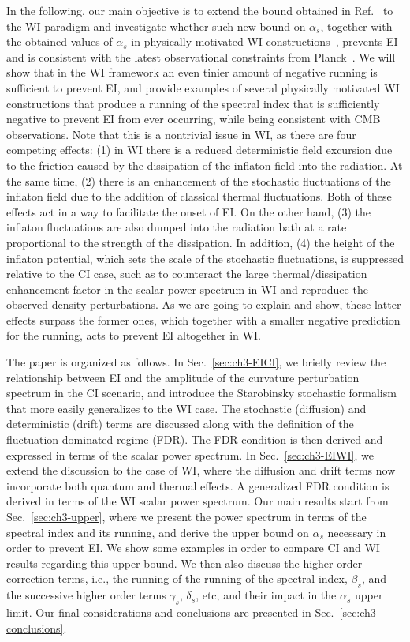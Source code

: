 In the following, our main objective is to extend the bound obtained in
Ref.~\cite{Kinney:2014jya} to the WI paradigm and investigate
whether such new bound on $\alpha_s$, together with the obtained
values of $\alpha_s$ in physically motivated WI constructions~\cite{Benetti:2016jhf,Das:2022ubr},
prevents EI  and is consistent with the latest observational constraints from Planck~\cite{Planck:2018jri}. We will show that in the WI framework an even tinier amount of negative running is sufficient to prevent EI, and provide examples of several physically motivated WI constructions that produce a running of the spectral index that is sufficiently negative to prevent EI from ever occurring, while being consistent with CMB observations.
Note that this is a nontrivial issue in WI, as there are four competing effects:   (1) in WI there is a reduced deterministic
field excursion due to the friction caused by the dissipation of the
inflaton field into the radiation. At the same time,  (2) there is an
enhancement of the stochastic fluctuations of the inflaton field due
to the addition of classical thermal fluctuations.  Both of these
effects act in a way to facilitate the onset of EI.  On the other hand, (3) the inflaton fluctuations are also dumped into the radiation bath at
a rate proportional to the strength of the dissipation.   In addition, (4) the
height of the inflaton potential, which sets the scale of the
stochastic fluctuations, is suppressed relative to the CI case, such
as to counteract the large thermal/dissipation enhancement factor in
the scalar power spectrum in WI and reproduce the observed density
perturbations. As we are going to explain and show, these latter effects surpass
the former ones, which together with a smaller negative prediction for
the running, acts to prevent EI altogether in WI.

The paper is organized as follows.  In Sec.~\ref{sec:ch3-EICI}, we briefly
review the relationship between EI and the
amplitude of the curvature perturbation spectrum in the CI scenario, and introduce the Starobinsky stochastic formalism that more easily generalizes to the WI case.  The stochastic (diffusion) and deterministic
(drift) terms are discussed along with the definition of the
fluctuation dominated regime (FDR).  The FDR condition is then derived
and expressed in terms of the scalar power spectrum.  In
Sec.~\ref{sec:ch3-EIWI}, we extend the discussion to the case of WI, where the
diffusion and drift terms now incorporate both quantum and thermal
effects.  A generalized FDR condition is derived in terms of the WI
scalar power spectrum.  Our main results start from Sec.~\ref{sec:ch3-upper},
where we present the power spectrum in terms of the spectral index and
its running, and derive the upper bound on $\alpha_s$ necessary in
order to prevent EI.  We show some examples in order to compare CI and
WI results regarding this upper bound.  We then also discuss the
higher order correction terms, i.e., the running of the running of the
spectral index, $\beta_s$, and the successive higher order terms
$\gamma_s$, $\delta_s$, etc, and their impact in the $\alpha_s$ upper
limit.  Our final considerations and conclusions are presented in
Sec.~\ref{sec:ch3-conclusions}.


